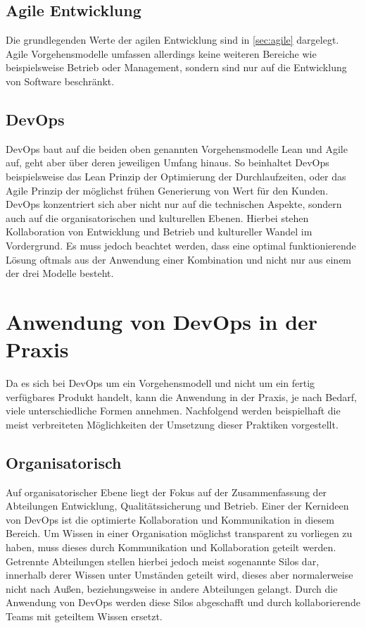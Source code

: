 \subsection{Agile Entwicklung}
Die grundlegenden Werte der agilen Entwicklung sind in \autoref{sec:agile} dargelegt.
Agile Vorgehensmodelle umfassen allerdings keine weiteren Bereiche wie beispielsweise Betrieb oder Management, sondern sind nur auf die Entwicklung von Software beschränkt.

\subsection{DevOps}
DevOps baut auf die beiden oben genannten Vorgehensmodelle Lean und Agile auf, geht aber über deren jeweiligen Umfang hinaus. 
So beinhaltet DevOps beispielsweise das Lean Prinzip der Optimierung der Durchlaufzeiten, oder das Agile Prinzip der möglichst frühen Generierung von Wert für den Kunden. 
DevOps konzentriert sich aber nicht nur auf die technischen Aspekte, sondern auch auf die organisatorischen und kulturellen Ebenen. 
Hierbei stehen Kollaboration von Entwicklung und Betrieb und kultureller Wandel im Vordergrund.
Es muss jedoch beachtet werden, dass eine optimal funktionierende Lösung oftmals aus der Anwendung einer Kombination und nicht nur aus einem der drei Modelle besteht.

\section{Anwendung von DevOps in der Praxis} \label{sec:anwendung_devops} %
Da es sich bei DevOps um ein Vorgehensmodell und nicht um ein fertig verfügbares Produkt handelt, kann die Anwendung in der Praxis, je nach Bedarf, viele unterschiedliche Formen annehmen. Nachfolgend werden beispielhaft die meist verbreiteten Möglichkeiten der Umsetzung dieser Praktiken vorgestellt.

\subsection{Organisatorisch}
Auf organisatorischer Ebene liegt der Fokus auf der Zusammenfassung der Abteilungen Entwicklung, Qualitätssicherung und Betrieb. 
Einer der Kernideen von DevOps ist die optimierte Kollaboration und Kommunikation in diesem Bereich. 
Um Wissen in einer Organisation möglichst transparent zu vorliegen zu haben, muss dieses durch Kommunikation und Kollaboration geteilt werden. 
Getrennte Abteilungen stellen hierbei jedoch meist sogenannte Silos dar, innerhalb derer Wissen unter Umständen geteilt wird, dieses aber normalerweise nicht nach Außen, beziehungsweise in andere Abteilungen gelangt. 
Durch die Anwendung von DevOps werden diese Silos abgeschafft und durch kollaborierende Teams mit geteiltem Wissen ersetzt. 
\parencite[Vgl.][S. 8]{huettermann:2012}

